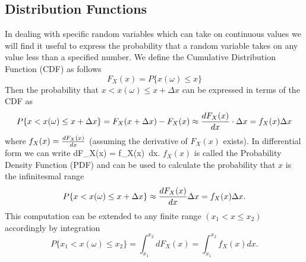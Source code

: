 \subsection{Distribution Functions}

In dealing with specific random variables which can take on continuous values we will find it useful to express the probability that a random variable takes on any value less than a specified number. We define the Cumulative Distribution Function  (CDF) as follows
$$F_X(x) = P\{x(\omega) \le x\} $$ Then the probability that $x < x(\omega) \le x + \Delta x$ can be expressed in terms of the  CDF as
$$P\{ x < x(\omega) \le x + \Delta x \} = F_X(x + \Delta x) - F_X(x) \approx {dF_X(x)\over dx} \cdot \Delta x = f_X(x) \Delta x $$where $f_X(x) = {dF_X(x) \over dx}$
(assuming the derivative of $F_X(x)$ exists). In differential form we can write \be dF_X(x) = f_X(x)\, dx. \ee $f_X(x)$ is called the Probability Density Function (PDF) and can be used to calculate the probability that $x$ is the infinitesmal range
$$P\{x < x(\omega) \le x + \Delta x \} \approx {dF_X(x)\over dx} \Delta x = f_X(x) \Delta x.$$ 
This computation can be extended to any finite range $(x_1 < x \le x_2)$ accordingly by integration
$$P\{x_1 < x(\omega) \le x_2\} = \int_{x_1}^{x_2} dF_X(x) = \int_{x_1}^{x_2} f_X(x) dx.$$